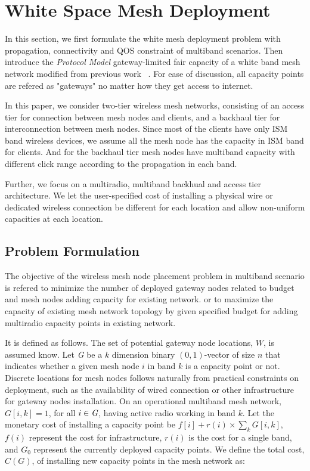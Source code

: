 \section{White Space Mesh Deployment}
\label{sec:model}

In this section, we first formulate the 
white mesh deployment problem
with propagation, connectivity and QOS constraint of multiband scenarios.
Then introduce the \emph{Protocol Model} gateway-limited fair capacity of a white band mesh network modified from previous work ~\cite{robinson2008adding}. 
For ease of discussion, all capacity points are refered as "gateways" no matter how they get access to internet.

In this paper, we consider two-tier wireless mesh networks, consisting of an access tier for connection between mesh nodes and clients, and a backhaul tier for interconnection between mesh nodes. 
Since most of the clients have only ISM band wireless devices, we assume all the mesh node has the capacity in ISM band for clients. And for the backhaul tier mesh nodes have multiband capacity with different click range according to the propagation in each band.

Further, we focus on a multiradio, multiband backhual and access tier architecture. We let the user-specified cost of installing a physical wire or dedicated wireless connection be different for each location and allow non-uniform capacities at each location.
 

\subsection{Problem Formulation}
The objective of the wireless mesh node placement problem in multiband scenario is refered to
minimize the number of deployed gateway nodes related to budget and mesh nodes adding capacity for existing network. 
or to maximize the capacity of existing mesh network topology by given specified budget for adding multiradio capacity points in existing network.

It is defined as follows.
The set of potential gateway node locations, $W$, is assumed know. 
Let \emph{G} be a $k$ dimension binary $(0,1)$-vector of size $n$ that indicates whether a given mesh node $i$ in band $k$ is a capacity point or not. 
Discrete locations for mesh nodes follows naturally from practical constraints on deployment, such as the availability of wired connection or other infrastructure for gateway nodes installation.
On an operational multiband mesh network, $G[i,k]=1$, for all $i\in \emph{G}$, having active radio working in band $k$. Let the monetary cost of installing a capacity point be $f[i]+r(i)\times \sum_kG[i,k]$, $f(i)$ represent the cost for infrastructure, $r(i)$ is the cost for a single band, and \emph{$G_0$} represent the currently deployed capacity points.
We define the total cost, $C(G)$, of installing new capacity points in the mesh network as:

